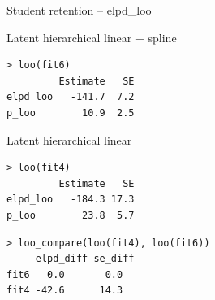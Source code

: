 \documentclass[english,t]{beamer}
\begin{document}
\begin{frame}[fragile]{Student retention -- elpd\_loo}

  {\color{gray}
Latent hierarchical linear + spline
\begin{verbatim}
> loo(fit6)
         Estimate   SE
elpd_loo   -141.7  7.2
p_loo        10.9  2.5
\end{verbatim}

Latent hierarchical linear
\begin{verbatim}
> loo(fit4)
         Estimate   SE
elpd_loo   -184.3 17.3
p_loo        23.8  5.7
\end{verbatim}
}

\begin{verbatim}
> loo_compare(loo(fit4), loo(fit6))
     elpd_diff se_diff
fit6   0.0       0.0  
fit4 -42.6      14.3  
\end{verbatim}

\end{frame}
\end{document}
